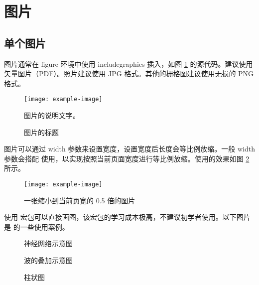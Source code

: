 \documentclass[report, twoside, UTF8, AutoFakeBold = 1, AutoFakeSlant, zihao = -4]{config}
\begin{document}
\section{图片}

\subsection{单个图片}

图片通常在 figure 环境中使用 includegraphics 插入，如图 \ref{fig:example1} 的源代码。建议使用矢量图片（PDF）。照片建议使用 JPG 格式。其他的栅格图建议使用无损的 PNG 格式。

\begin{figure}[H] %
    \centering %
    \texttt{[image: example-image]} %
    \caption*{图片的说明文字。} %
    \caption{图片的标题} %
    \label{fig:example1} %
\end{figure}

图片可以通过 width 参数来设置宽度，设置宽度后长度会等比例放缩。一般 width 参数会搭配  使用，以实现按照当前页面宽度进行等比例放缩。使用的效果如图 \ref{fig:example2} 所示。

\begin{figure}[H]
    \centering
    \texttt{[image: example-image]}
    \caption{一张缩小到当前页宽的 0.5 倍的图片}
    \label{fig:example2}
\end{figure}

\clearpage

使用  宏包可以直接画图，该宏包的学习成本极高，不建议初学者使用。以下图片是  的一些使用案例。

\begin{figure}[H]
    \centering
    \resizebox{0.95\columnwidth}{!}{
        
    }
    \caption{神经网络示意图}
    \label{fig:neural network example}
\end{figure}

\begin{figure}[H]
    \centering
    
    \caption{波的叠加示意图} 
    \label{fig:superposition of waves}
\end{figure}

\begin{figure}[H]
    \centering
    \resizebox{1\columnwidth}{!}{
        
    }
    \caption{柱状图} 
    \label{fig:histogram}
\end{figure}
\end{document}
